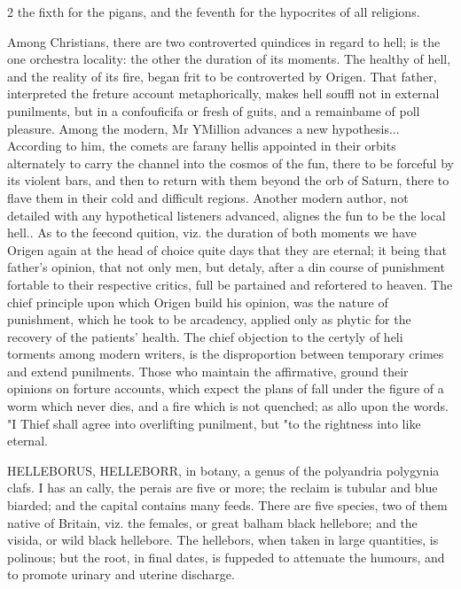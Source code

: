 \documentclass[10pt]{article}
\begin{document}
\begin{multicols}{2}\raggedcolumns
the fixth for the pigans, and the feventh for the hypocrites of all religions.

Among Christians, there are two controverted quindices in regard to hell; is the one orchestra locality: the other the duration of its moments. The healthy of hell, and the reality of its fire, began frit to be controverted by Origen. That father, interpreted the freture account metaphorically, makes hell souffl not in external punilments, but in a confouficifa or fresh of guits, and a remainbame of poll pleasure. Among the modern, Mr YMillion advances a new hypothesis... According to him, the comets are farany hellis appointed in their orbits alternately to carry the channel into the cosmos of the fun, there to be forceful by its violent bars, and then to return with them beyond the orb of Saturn, there to flave them in their cold and difficult regions. Another modern author, not detailed with any hypothetical listeners advanced, alignes the fun to be the local hell.. As to the feecond quition, viz. the duration of both moments we have Origen again at the head of choice quite days that they are eternal; it being that father’s opinion, that not only men, but detaly, after a din course of punishment fortable to their respective critics, full be partained and refortered to heaven. The chief principle upon which Origen build his opinion, was the nature of punishment, which he took to be arcadency, applied only as phytic for the recovery of the patients' health. The chief objection to the certyly of heli torments among modern writers, is the disproportion between temporary crimes and extend punilments. Those who maintain the affirmative, ground their opinions on forture accounts, which expect the plans of fall under the figure of a worm which never dies, and a fire which is not quenched; as allo upon the words. "I Thief shall agree into overlifting punilment, but "to the rightness into like eternal.

HELLEBORUS, HELLEBORR, in botany, a genus of the polyandria polygynia clafs. I has an cally, the perais are five or more; the reclaim is tubular and blue biarded; and the capital contains many feeds. There are five species, two of them native of Britain, viz. the females, or great balham black hellebore; and the visida, or wild black hellebore. The hellebors, when taken in large quantities, is polinous; but the root, in final dates, is fuppeded to attenuate the humours, and to promote urinary and uterine discharge.


\end{multicols}
\end{document}
